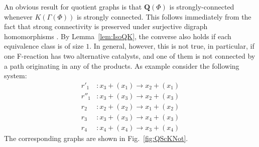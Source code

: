 \documentclass[pdflatex]{sn-jnl}
\theoremstyle{thmstyleone}%
\theoremstyle{examplesty}%
\theoremstyle{thmstylethree}%
\newcommand{\king}{K}
\newcommand{\queen}{\mathbf{Q}}
\begin{document}
An obvious result for quotient graphs is that $\queen(\Phi)$ is
strongly-connected whenever $\king(\Gamma(\Phi))$ is strongly
connected. This follows immediately from the fact that strong connectivity
is preserved under surjective digraph homomorphisms
\cite{hell_graphs_2026}.  By Lemma~\ref{lem:IsoQK}, the converse also holds
if each equivalence class is of size $1$.  In general, however, this is not
true, in particular, if one F-reaction has two alternative catalysts, and
one of them is not connected by a path originating in any of the products.
As example consider the following system:
\begin{equation}
	\begin{split}
		r'_1 &: x_3 + (x_1) 		\rightarrow x_2  + (x_1) \\
		r''_1 &: x_3 + (x_3) 		\rightarrow x_2  + (x_3) \\
		r_2 &: x_2	+ (x_2)	   	\rightarrow x_1 + (x_2) \\
		r_3 &: x_3 + (x_3) 		\rightarrow x_4 + (x_3)  \\
		r_4 &: x_4 + (x_4)		\rightarrow x_3 + (x_4)
	\end{split}
\end{equation}
The corresponding graphs are shown in Fig.~\ref{fig:QScKNot}.
\end{document}
